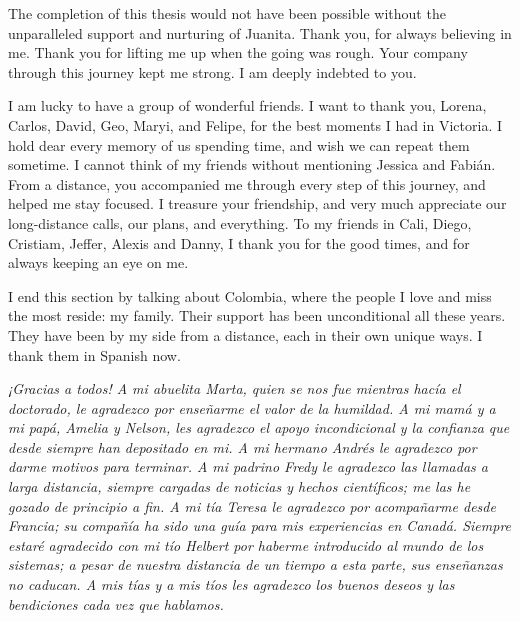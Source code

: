 {The completion of this thesis would not have been possible without the unparalleled support and nurturing of Juanita. Thank you, for always believing in me. Thank you for lifting me up when the going was rough. Your company through this journey kept me strong. I am deeply indebted to you.

I am lucky to have a group of wonderful friends. I want to thank you, Lorena, Carlos, David, Geo, Maryi, and Felipe, for the best moments I had in Victoria. I hold dear every memory of us spending time, and wish we can repeat them sometime. I cannot think of my friends without mentioning Jessica and Fabi\'{a}n. From a distance, you accompanied me through every step of this journey, and helped me stay focused. I treasure your friendship, and very much appreciate our long-distance calls, our plans, and everything. To my friends in Cali, Diego, Cristiam, Jeffer, Alexis and Danny, I thank you for the good times, and for always keeping an eye on me.

I end this section by talking about Colombia, where the people I love and miss the most reside: my family. Their support has been unconditional all these years. They have been by my side from a distance, each in their own unique ways. I thank them in Spanish now.

\emph{¡Gracias a todos! A mi abuelita Marta, quien se nos fue mientras hac\'{i}a el doctorado, le agradezco por ense\~{n}arme el valor de la humildad. A mi mam\'{a} y a mi pap\'{a}, Amelia y Nelson, les agradezco el apoyo incondicional y la confianza que desde siempre han depositado en mi. A mi hermano Andr\'{e}s le agradezco por darme motivos para terminar. A mi padrino Fredy le agradezco las llamadas a larga distancia, siempre cargadas de noticias y hechos cient\'{i}ficos; me las he gozado de principio a fin. A mi t\'{i}a Teresa le agradezco por acompañarme desde Francia; su compa\~{n}\'{i}a ha sido una gu\'{i}a para mis experiencias en Canad\'{a}. Siempre estar\'{e} agradecido con mi t\'{i}o Helbert por haberme introducido al mundo de los sistemas; a pesar de nuestra distancia de un tiempo a esta parte, sus ense\~{n}anzas no caducan. A mis t\'{i}as y a mis t\'{i}os les agradezco los buenos deseos y las bendiciones cada vez que hablamos.}

}%
